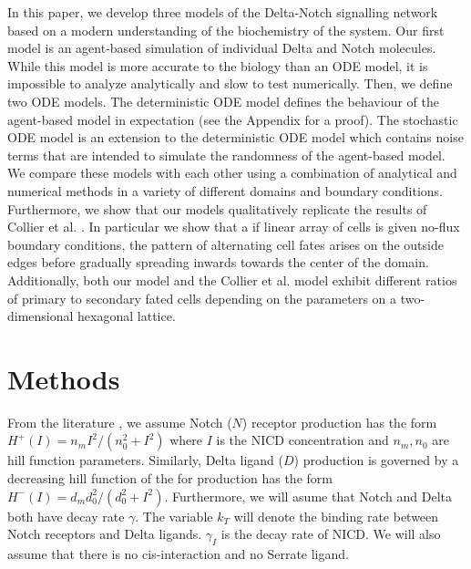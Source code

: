 \documentclass{article}
\begin{document}
\begin{flushleft}
\medskip

In this paper, we develop three models of the Delta-Notch signalling network based on a modern understanding of the biochemistry of the system. 
Our first model is an agent-based simulation of individual Delta and Notch molecules. 
While this model is more accurate to the biology than an ODE model, it is impossible to analyze analytically and slow to test numerically.
Then, we define two ODE models. 
The deterministic ODE model defines the behaviour of the agent-based model in expectation (see the Appendix for a proof).
The stochastic ODE model is an extension to the deterministic ODE model which contains noise terms that are intended to simulate the randomness of the agent-based model.
We compare these models with each other using a combination of analytical and numerical methods in a variety of different domains and boundary conditions.
Furthermore, we show that our models qualitatively replicate the results of Collier et al. \cite{collier_pattern_1996}. 
In particular we show that a if linear array of cells is given no-flux boundary conditions, the pattern of alternating cell fates arises on the outside edges before gradually spreading inwards towards the center of the domain.
Additionally, both our model and the Collier et al. model exhibit different ratios of primary to secondary fated cells depending on the parameters on a two-dimensional hexagonal lattice. 

\section*{Methods}

From the literature \cite{collier_pattern_1996, boareto_jaggeddelta_2015}, we assume Notch ($N$) receptor production has the form $H^{+}(I) = n_{m}I^2/(n_{0}^2 + I^2)$ where $I$ is the NICD concentration and $n_{m}, n_{0}$ are hill function parameters.
Similarly, Delta ligand ($D$) production is governed by a decreasing hill function of the for production has the form $H^{-}(I) = d_{m}d_{0}^2/(d_{0}^2 + I^2)$.
Furthermore, we will asume that Notch and Delta both have decay rate $\gamma$.
The variable $k_{T}$ will denote the binding rate between Notch receptors and Delta ligands.
$\gamma_{I}$ is the decay rate of NICD.
We will also assume that there is no cis-interaction and no Serrate ligand. 


\end{flushleft}
\end{document}
